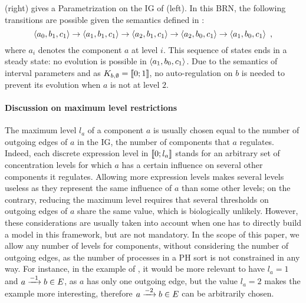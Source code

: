 \begin{example}
(right) gives a Parametrization on the IG of (left).
In this BRN, the following transitions are possible given the semantics defined in :
$$\mbox{$\langle a_0, b_1, c_1 \rangle$} \rightarrow \mbox{$\langle a_1, b_1, c_1 \rangle$} \rightarrow \mbox{$\langle a_2, b_1, c_1 \rangle$} \rightarrow
\mbox{$\langle a_2, b_0, c_1 \rangle$} \rightarrow \mbox{$\langle a_1, b_0, c_1 \rangle$} \enspace,$$
where $a_i$ denotes the component $a$ at level $i$.
This sequence of states ends in a steady state: no evolution is possible in $\mbox{$\langle a_1, b_0, c_1 \rangle$}$.
Due to the semantics of interval parameters and as $K_{b,\emptyset} = \llbracket 0 ; 1 \rrbracket$, no auto-regulation on $b$ is needed to prevent its evolution when $a$ is not at level $2$.
\end{example}



\paragraph{Discussion on maximum level restrictions}
The maximum level $l_a$ of a component $a$ is usually chosen equal to the number of outgoing edges of $a$ in the IG, \ie the number of components that $a$ regulates.
Indeed, each discrete expression level in $\llbracket 0 ; l_a \rrbracket$ stands for an arbitrary set of concentration levels for which $a$ has a certain influence on several other components it regulates.
Allowing more expression levels makes several levels useless as they represent the same influence of $a$ than some other levels;
on the contrary, reducing the maximum level requires that several thresholds on outgoing edges of $a$ share the same value, which is biologically unlikely.
However, these considerations are usually taken into account when one has to directly build a model in this framework, but are not mandatory.
In the scope of this paper, we allow any number of levels for components, without considering the number of outgoing edges,
as the number of processes in a PH sort is not constrained in any way.
For instance, in the example of ,
it would be more relevant to have $l_a = 1$ and $a \xrightarrow{- 1} b \in E$, as $a$ has only one outgoing edge,
but the value $l_a = 2$ makes the example more interesting, therefore $a \xrightarrow{- 2} b \in E$ can be arbitrarily chosen.

